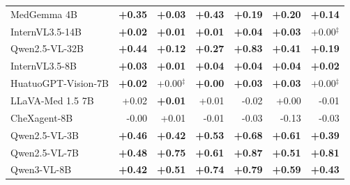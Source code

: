 \documentclass{article}
\begin{document}
\begin{table}[htbp]
{\begin{tabular}{lrrrrrr}
MedGemma 4B & \cellcolor{cfTerra4}\textbf{+0.35} & \cellcolor{cfTerra2}\textbf{+0.03} & \cellcolor{cfTerra4}\textbf{+0.43} & \cellcolor{cfTerra3}\textbf{+0.19} & \cellcolor{cfTerra3}\textbf{+0.20} & \cellcolor{cfTerra3}\textbf{+0.14} \\
InternVL3.5-14B & \cellcolor{cfTerra1}\textbf{+0.02} & \cellcolor{cfTerra1}\textbf{+0.01} & \cellcolor{cfTerra1}\textbf{+0.01} & \cellcolor{cfTerra2}\textbf{+0.04} & \cellcolor{cfTerra2}\textbf{+0.03} & \cellcolor{cfTerra1}+0.00$^{\ddagger}$ \\
Qwen2.5-VL-32B & \cellcolor{cfTerra4}\textbf{+0.44} & \cellcolor{cfTerra3}\textbf{+0.12} & \cellcolor{cfTerra4}\textbf{+0.27} & \cellcolor{cfTerra4}\textbf{+0.83} & \cellcolor{cfTerra4}\textbf{+0.41} & \cellcolor{cfTerra3}\textbf{+0.19} \\
InternVL3.5-8B & \cellcolor{cfTerra2}\textbf{+0.03} & \cellcolor{cfTerra1}\textbf{+0.01} & \cellcolor{cfTerra2}\textbf{+0.04} & \cellcolor{cfTerra2}\textbf{+0.04} & \cellcolor{cfTerra2}\textbf{+0.04} & \cellcolor{cfTerra1}\textbf{+0.02} \\
HuatuoGPT-Vision-7B & \cellcolor{cfTerra1}\textbf{+0.02} & \cellcolor{cfTerra1}+0.00$^{\ddagger}$ & \cellcolor{cfTerra1}\textbf{+0.00} & \cellcolor{cfTerra2}\textbf{+0.03} & \cellcolor{cfTerra2}\textbf{+0.03} & \cellcolor{cfTerra1}+0.00$^{\ddagger}$ \\
LLaVA-Med 1.5 7B & \cellcolor{cfTerra1}+0.02 & \cellcolor{cfTerra1}\textbf{+0.01} & \cellcolor{cfTerra1}+0.01 & \cellcolor{cfSlate2}-0.02 & \cellcolor{cfTerra1}+0.00 & \cellcolor{cfSlate1}-0.01 \\
CheXagent-8B & \cellcolor{cfSlate1}-0.00 & \cellcolor{cfTerra1}+0.01 & \cellcolor{cfSlate1}-0.01 & \cellcolor{cfSlate2}-0.03 & \cellcolor{cfSlate3}-0.13 & \cellcolor{cfSlate2}-0.03 \\
Qwen2.5-VL-3B & \cellcolor{cfTerra4}\textbf{+0.46} & \cellcolor{cfTerra4}\textbf{+0.42} & \cellcolor{cfTerra4}\textbf{+0.53} & \cellcolor{cfTerra4}\textbf{+0.68} & \cellcolor{cfTerra4}\textbf{+0.61} & \cellcolor{cfTerra4}\textbf{+0.39} \\
Qwen2.5-VL-7B & \cellcolor{cfTerra4}\textbf{+0.48} & \cellcolor{cfTerra4}\textbf{+0.75} & \cellcolor{cfTerra4}\textbf{+0.61} & \cellcolor{cfTerra4}\textbf{+0.87} & \cellcolor{cfTerra4}\textbf{+0.51} & \cellcolor{cfTerra4}\textbf{+0.81} \\
Qwen3-VL-8B & \cellcolor{cfTerra4}\textbf{+0.42} & \cellcolor{cfTerra4}\textbf{+0.51} & \cellcolor{cfTerra4}\textbf{+0.74} & \cellcolor{cfTerra4}\textbf{+0.79} & \cellcolor{cfTerra4}\textbf{+0.59} & \cellcolor{cfTerra4}\textbf{+0.43} \\

\end{tabular}}
\end{table}
\end{document}
